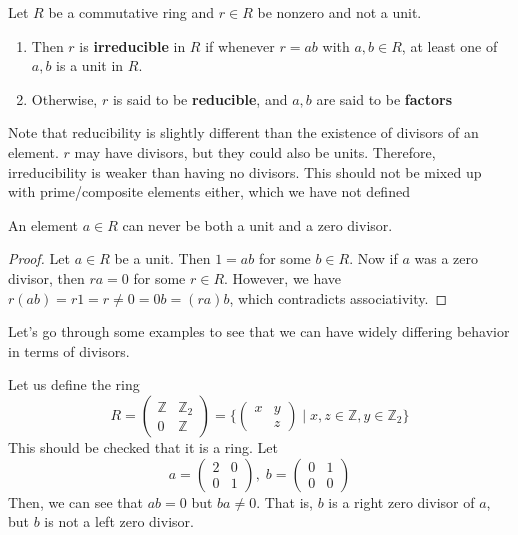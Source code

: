   \begin{definition}
    Let $R$ be a commutative ring and $r \in R$ be nonzero and not a unit. 
    \begin{enumerate}
      \item Then $r$ is \textbf{irreducible} in $R$ if whenever $r = ab$ with $a, b \in R$, at least one of $a, b$ is a unit in $R$. 
      \item Otherwise, $r$ is said to be \textbf{reducible}, and $a, b$ are said to be \textbf{factors}
    \end{enumerate}
  \end{definition}
  
  Note that reducibility is slightly different than the existence of divisors of an element. $r$ may have divisors, but they could also be units. Therefore, irreducibility is weaker than having no divisors. This should not be mixed up with prime/composite elements either, which we have not defined 

  \begin{lemma}
    An element $a \in R$ can never be both a unit and a zero divisor. 
  \end{lemma}
  \begin{proof}
    Let $a \in R$ be a unit. Then $1 = ab$ for some $b \in R$. Now if $a$ was a zero divisor, then $ra = 0$ for some $r \in R$. However, we have $r(ab) = r1 = r \neq 0 = 0b = (ra)b$, which contradicts associativity. 
  \end{proof}

  Let's go through some examples to see that we can have widely differing behavior in terms of divisors. 

  \begin{example}
    Let us define the ring
    \begin{equation}
      R = \begin{pmatrix} \mathbb{Z} & \mathbb{Z}_2 \\ 0 & \mathbb{Z} \end{pmatrix} = \bigg\{ \begin{pmatrix} x & y \\ & z \end{pmatrix} \; \bigg| \; x, z \in \mathbb{Z}, y \in \mathbb{Z}_2 \bigg\} 
    \end{equation}
    This should be checked that it is a ring. Let 
    \begin{equation}
      a = \begin{pmatrix} 2 & 0 \\ 0 & 1 \end{pmatrix}, \; b = \begin{pmatrix} 0 & 1 \\ 0 & 0 \end{pmatrix}
    \end{equation}
    Then, we can see that $ab = 0$ but $ba \neq 0$. That is, $b$ is a right zero divisor of $a$, but $b$ is not a left zero divisor. 
  \end{example}

